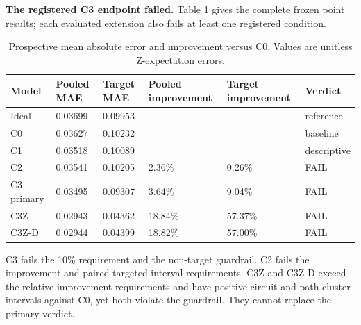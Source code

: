 \documentclass[11pt,a4paper]{article}
\begin{document}
\textbf{The registered C3 endpoint failed.} Table 1 gives the complete frozen point results; each evaluated extension also fails at least one registered condition.


\begin{table}[htbp]
\caption{Prospective mean absolute error and improvement versus C0. Values are unitless Z-expectation errors.}
\centering
\small
\setlength{\tabcolsep}{3pt}
\begin{tabularx}{\linewidth}{@{}YYYYYY@{}}
\toprule
Model & Pooled MAE & Target MAE & Pooled improvement & Target improvement & Verdict \\
\midrule
Ideal & 0.03699 & 0.09953 &  &  & reference \\
C0 & 0.03627 & 0.10232 &  &  & baseline \\
C1 & 0.03518 & 0.10089 &  &  & descriptive \\
C2 & 0.03541 & 0.10205 & 2.36\% & 0.26\% & FAIL \\
C3 primary & 0.03495 & 0.09307 & 3.64\% & 9.04\% & FAIL \\
C3Z & 0.02943 & 0.04362 & 18.84\% & 57.37\% & FAIL \\
C3Z-D & 0.02944 & 0.04399 & 18.82\% & 57.00\% & FAIL \\
\bottomrule
\end{tabularx}
\end{table}

C3 fails the 10\% requirement and the non-target guardrail. C2 fails the improvement and paired targeted interval requirements. C3Z and C3Z-D exceed the relative-improvement requirements and have positive circuit and path-cluster intervals against C0, yet both violate the guardrail. They cannot replace the primary verdict.
\end{document}
